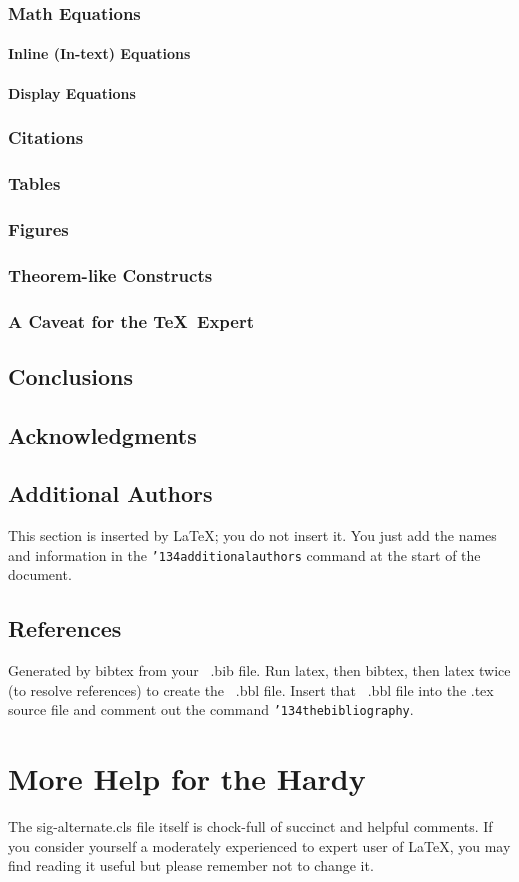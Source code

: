 \documentclass{sig-alternate-br}
\begin{document}
\subsubsection{Math Equations}
\paragraph{Inline (In-text) Equations}
\paragraph{Display Equations}
\subsubsection{Citations}
\subsubsection{Tables}
\subsubsection{Figures}
\subsubsection{Theorem-like Constructs}
\subsubsection*{A Caveat for the \TeX\ Expert}
\subsection{Conclusions}
\subsection{Acknowledgments}
\subsection{Additional Authors}
This section is inserted by \LaTeX; you do not insert it. You just
add the names and information in the
\texttt{{\char'134}additionalauthors} command at the start of the
document.
\subsection{References}
Generated by bibtex from your ~.bib file.  Run latex, then bibtex,
then latex twice (to resolve references) to create the ~.bbl file.
Insert that ~.bbl file into the .tex source file and comment out
the command \texttt{{\char'134}thebibliography}.
\section{More Help for the Hardy}
The sig-alternate.cls file itself is chock-full of succinct and
helpful comments.  If you consider yourself a moderately
experienced to expert user of \LaTeX, you may find reading it
useful but please remember not to change it.

\balancecolumns
\end{document}
